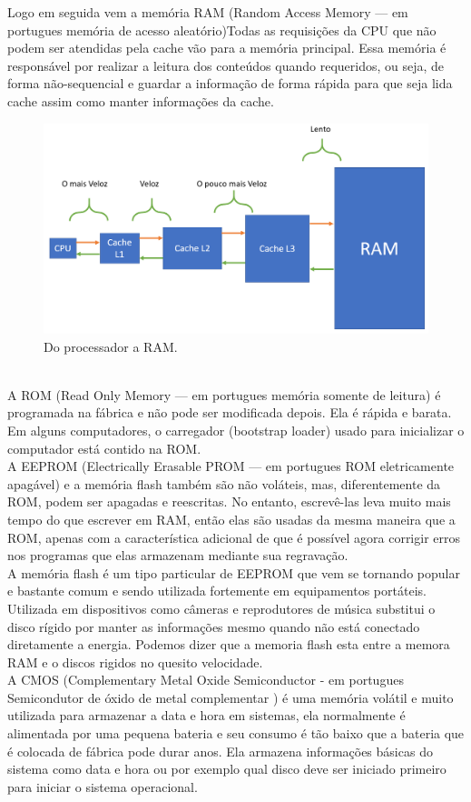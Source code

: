 Logo em seguida vem a memória RAM (Random Access Memory — em portugues memória de acesso aleatório)Todas as requisições da CPU que não podem ser atendidas pela cache vão para a memória principal. Essa memória é responsável por realizar a leitura dos conteúdos quando requeridos, ou seja, de forma não-sequencial e guardar a informação de forma rápida para que seja lida cache assim como manter informações da cache.
\begin{figure}[htpb]
    \centering
   \includegraphics[scale=0.25]{imagens/velocidaderam.png}
   \caption{Do processador a RAM.}
   \label{fig:velocidade}
\end{figure}\\

A ROM (Read Only Memory — em portugues memória somente de leitura) é programada na fábrica e não pode ser modificada depois. Ela é rápida e barata. Em alguns computadores, o carregador (bootstrap loader) usado para inicializar o computador está contido na ROM.\\
A EEPROM (Electrically Erasable PROM — em portugues ROM eletricamente apagável) e a memória flash também são não voláteis, mas, diferentemente da ROM, podem ser apagadas e reescritas. No entanto, escrevê-las leva muito mais tempo do que escrever em RAM, então elas são usadas da mesma maneira que a ROM, apenas com a característica adicional de que é possível agora corrigir erros nos programas que elas armazenam mediante sua regravação. \\
A memória flash é um tipo particular de EEPROM que vem se tornando popular e  bastante comum e sendo utilizada fortemente em equipamentos portáteis. Utilizada em dispositivos como câmeras  e reprodutores de música substitui o disco rígido por manter as informações mesmo quando não está conectado diretamente a energia. Podemos dizer que a memoria flash esta entre a memora RAM e o discos rigidos no quesito velocidade. \\
A CMOS (Complementary Metal Oxide Semiconductor - em portugues 
Semicondutor de óxido de metal complementar
) é uma memória volátil e muito utilizada para armazenar a data e hora em sistemas, ela normalmente é alimentada por uma pequena bateria e seu consumo é tão baixo que a bateria que  é colocada de fábrica pode durar anos. Ela armazena informações básicas do sistema como data e hora ou por exemplo qual disco deve ser iniciado primeiro para iniciar o sistema operacional.
